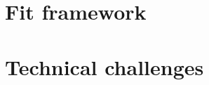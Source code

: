 \documentclass[../main.tex]{subfiles}
\begin{document}
%
%


\section{Fit framework}
\label{sec:joint_fit:framework}
%
%
%
%
%

\section{Technical challenges}
\label{sec:joint_fit:tech}
%
%
%
\end{document}
